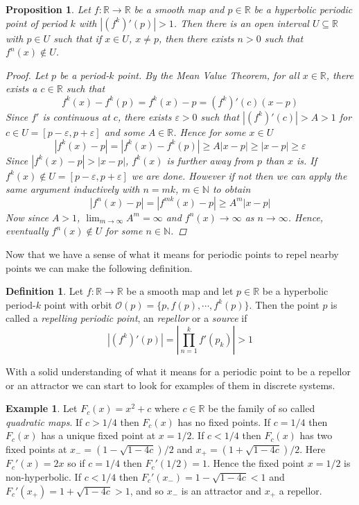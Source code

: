 \documentclass[11pt,a4paper,oneside]{memoir}
\theoremstyle{plain}
\newtheorem{prop}[thm]{Proposition}
\theoremstyle{definition}
\newtheorem{defn}[thm]{Definition}
\newtheorem{exmp}[thm]{Example}
\begin{document}
\begin{prop} \label{prop:repellor}
    Let $f: \mathbb{R} \to \mathbb{R}$ be a smooth map and $p \in \mathbb{R}$ be a hyperbolic periodic point of period $k$ with $|(f^k)'(p)| > 1$. Then there is an open interval $U \subseteq \mathbb{R}$ with $p \in U$ such that if $x \in U$, $x \neq p$, then there exists $n > 0$ such that $f^n(x) \notin U$.

    \begin{proof}
        Let $p$ be a period-$k$ point. By the Mean Value Theorem, for all $x \in \mathbb{R}$, there exists a $c \in \mathbb{R}$ such that \[f^k(x) - f^k(p) = f^k(x) - p = (f^k)'(c)(x - p)\] Since $f'$ is continuous at $c$, there exists $\varepsilon > 0$ such that $|(f^k)'(c)| > A > 1$ for $c \in U = [p - \varepsilon, p + \varepsilon]$ and some $A \in \mathbb{R}$. Hence for some $x \in U$ \[|f^k(x) - p| = |f^k(x) - f^k(p)| \geq A|x - p| \geq |x - p| \geq \varepsilon\] Since $|f^k(x) - p| > |x - p|$, $f^k(x)$ is further away from $p$ than $x$ is. If $f^k(x) \notin U = [p - \varepsilon, p + \varepsilon]$ we are done. However if not then we can apply the same argument inductively with $n = mk$, $m \in \mathbb{N}$ to obtain \[ |f^n(x) - p| = |f^{mk}(x) - p| \geq A^m|x - p|\] Now since $A > 1$, $\lim_{m \to \infty}A^m = \infty$ and $f^n(x) \to \infty$ as $n \to \infty$. Hence, eventually $f^n(x) \notin U$ for some $n \in \mathbb{N}$.
    \end{proof}
\end{prop}

Now that we have a sense of what it means for periodic points to repel nearby points we can make the following definition.

\begin{defn} \label{def:repellor}
    Let $f: \mathbb{R} \to \mathbb{R}$ be a smooth map and let $p \in \mathbb{R}$ be a hyperbolic period-$k$ point with orbit $\mathcal{O}(p) = \lbrace p, f(p), \cdots, f^k(p) \rbrace$. Then the point $p$ is called a \emph{repelling periodic point}, an \emph{repellor} or a \emph{source} if \[|(f^k)'(p)| = \left\lvert \prod_{n = 1}^k f'(p_k) \right\rvert > 1\]
\end{defn}

With a solid understanding of what it means for a periodic point to be a repellor or an attractor we can start to look for examples of them in discrete systems.

\begin{exmp}
    Let $F_c(x) = x^2 + c$ where $c \in \mathbb{R}$ be the family of so called \emph{quadratic maps}. If $c > 1/4$ then $F_c(x)$ has no fixed points. If $c = 1/4$ then $F_c(x)$ has a unique fixed point at $x = 1/2$. If $c < 1/4$ then $F_c(x)$ has two fixed points at $x_- = (1 - \sqrt{1 - 4c}) / 2$ and $x_+ = (1 + \sqrt{1 - 4c}) / 2$. Here $F_c'(x) = 2x$ so if $c = 1/4$ then $F_c'(1/2) = 1$. Hence the fixed point $x = 1/2$ is non-hyperbolic. If $c < 1/4$ then $F_c'(x_-) = 1 - \sqrt{1 - 4c} < 1$ and $F_c'(x_+) = 1 + \sqrt{1 - 4c} > 1$, and so $x_-$ is an attractor and $x_+$ a repellor.
\end{exmp}
\end{document}

